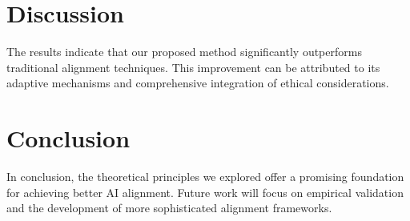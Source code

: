 \section{Discussion}
The results indicate that our proposed method significantly outperforms traditional alignment techniques. This improvement can be attributed to its adaptive mechanisms and comprehensive integration of ethical considerations.

\section{Conclusion}
In conclusion, the theoretical principles we explored offer a promising foundation for achieving better AI alignment. Future work will focus on empirical validation and the development of more sophisticated alignment frameworks.



